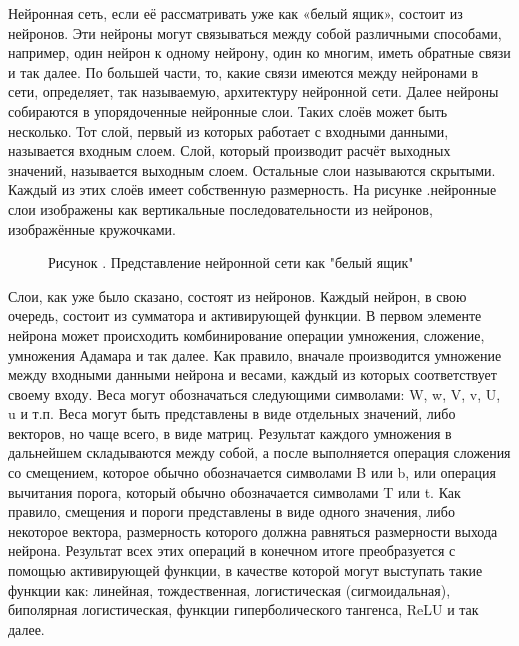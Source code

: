 {	\par \redline Нейронная сеть, если её рассматривать уже как «белый ящик», состоит из нейронов. Эти нейроны могут связываться между собой различными способами, например, один нейрон к одному нейрону, один ко многим, иметь обратные связи и так далее. По большей части, то, какие связи имеются между нейронами в сети, определяет, так называемую, архитектуру нейронной сети. Далее нейроны собираются в упорядоченные нейронные слои. Таких слоёв может быть несколько. Тот слой, первый из которых работает с входными данными, называется входным слоем. Слой, который производит расчёт выходных значений, называется выходным слоем. Остальные слои называются скрытыми. Каждый из этих слоёв имеет собственную размерность. На рисунке \thechaptercntr.\theimagecntr \spc нейронные слои изображены как вертикальные последовательности из нейронов, изображённые кружочками.
	
	\begin{figure}
		\centering
		\def\svgwidth{\textwidth}
		
		\caption*{\gostFont Рисунок \thechaptercntr .\theimagecntr \spc {--} Представление нейронной сети как "белый ящик"}
		\label{fig:NNWhiteBox}
	\end{figure} \addtocounter{imagecntr}{1}
	
	\par \redline Слои, как уже было сказано, состоят из нейронов. Каждый нейрон, в свою очередь, состоит из сумматора и активирующей функции. В первом элементе нейрона может происходить комбинирование операции умножения, сложение, умножения Адамара и так далее. Как правило, вначале производится умножение между входными данными нейрона и весами, каждый из которых соответствует своему входу. Веса могут обозначаться следующими символами: W, w, V, v, U, u и т.п. Веса могут быть представлены в виде отдельных значений, либо векторов, но чаще всего, в виде матриц. Результат каждого умножения в дальнейшем складываются между собой, а после выполняется операция сложения со смещением, которое обычно обозначается символами B или b, или операция вычитания порога, который обычно обозначается символами T или t. Как правило, смещения и пороги представлены в виде одного значения, либо некоторое вектора, размерность которого должна равняться размерности выхода нейрона.  Результат всех этих операций в конечном итоге преобразуется с помощью активирующей функции, в качестве которой могут выступать такие функции как: линейная, тождественная, логистическая (сигмоидальная), биполярная логистическая, функции гиперболического тангенса, ReLU и так далее.  
	
}

